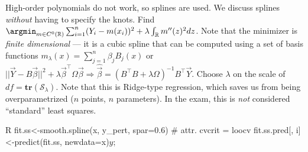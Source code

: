 \begin{sectionbox}\nospacing{}
  High-order polynomials do not work, so splines are used. We discuss splines \emph{without} having to specify the knots.
  Find $\argmin_{m \in C^{0}(\mathbb{R})} \sum_{i=1}^{n}(Y_{i} - m(x_{i}))^{2} + \lambda \int_{\mathbb{R}}m''(z)^{2} dz$.
  Note that the minimizer is \emph{finite dimensional} --- it is a cubic spline that can be computed using a set of basis functions $m_{\lambda}(x) = \sum_{j=1}^{n}\beta_{j}B_{j}(x)$ or $||\vec{Y} - B\vec{\beta}||^{2}+\lambda \vec{\beta}^{\top}\Omega\vec{\beta} \Rightarrow \hat{\vec{\beta}} = {(B^{\top}B + \lambda\Omega)}^{-1}B^{\top}\vec{Y}$.
  Choose $\lambda$ on the scale of $df = \mathbf{tr}(\mathcal{S}_{\lambda})$.
  Note that this is Ridge-type regression, which saves us from being overparametrized ($n$ points, $n$ parameters).
  In the exam, this is \emph{not} considered ``standard'' least squares.
  \begin{mintlinebox}{R}
    fit.ss<-smooth.spline(x, y_pert, spar=0.6) # attr. cvcrit = loocv
    fit.ss.pred[, i]<-predict(fit.ss, newdata=x)$y ; $
  \end{mintlinebox}
\end{sectionbox}

